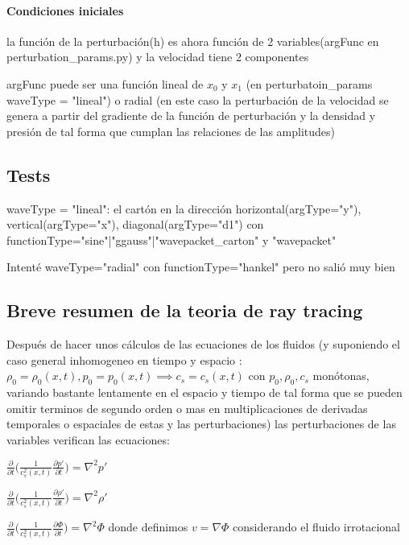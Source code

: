 \documentclass{article}
\begin{document}
\paragraph{Condiciones iniciales}
\begin{description}
\item la función de la perturbación(h) es ahora función de 2 variables(argFunc en perturbation\_params.py)  y la velocidad tiene 2 componentes
\item argFunc puede ser una función lineal de $x_0$ y $x_1$ (en perturbatoin\_params waveType = "lineal") o radial (en este caso la perturbación de la velocidad se genera a partir del gradiente de la función de perturbación y la densidad y presión  de tal forma que cumplan las relaciones de las amplitudes)

\end{description}
	
\subsection{Tests}

\begin{description}
\item waveType = "lineal": el cartón en la dirección horizontal(argType="y"), vertical(argType="x"), diagonal(argType="d1") con functionType="sine"|"ggauss"|"wavepacket\_carton"  y "wavepacket"
\item Intenté waveType="radial" con functionType="hankel" pero no salió muy bien
\end{description}


\subsection{Breve resumen de la teoria de ray tracing}
\begin{description}
\item Después de hacer unos cálculos de las ecuaciones de los fluidos (y suponiendo el caso general inhomogeneo en tiempo y espacio : 
$\rho_0 = \rho_0(x,t),p_0 = p_0(x,t) \implies c_s = c_s(x,t)$ 
con  $p_0, \rho_0, c_s$  monótonas, variando bastante lentamente en el espacio y tiempo de tal forma que se pueden omitir terminos de segundo orden o mas en multiplicaciones de derivadas temporales o espaciales de estas y las perturbaciones) las perturbaciones de las variables verifican las ecuaciones: 

\item $\frac{\partial}{\partial t} \big(\frac{1}{c_s^{2}(x,t)} \frac{\partial p\prime}{\partial t}\big) = \nabla^{2} p\prime    $
\item $\frac{\partial}{\partial t} \big(\frac{1}{c_s^{2}(x,t)} \frac{\partial \rho\prime}{\partial t}\big) = \nabla^{2} \rho\prime    $
\item $\frac{\partial}{\partial t} \big(\frac{1}{c_s^{2}(x,t)} \frac{\partial \Phi}{\partial t}\big) = \nabla^{2} \Phi $ donde definimos  $v = \nabla \Phi$ considerando el fluido irrotacional

\end{description}  
\end{document}
